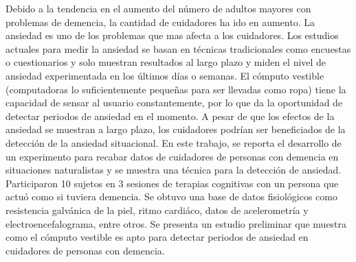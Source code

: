 Debido a la tendencia en el aumento del n\'umero de adultos mayores con problemas de demencia, la cantidad de cuidadores ha ido en aumento. La ansiedad es uno de los problemas que mas afecta a los cuidadores. Los estudios actuales para medir la ansiedad se basan en t\'ecnicas tradicionales como encuestas o cuestionarios y solo muestran resultados al largo plazo y miden el nivel de ansiedad experimentada en los \'ultimos d\'ias o semanas. El c\'omputo vestible (computadoras lo suficientemente peque\~nas para ser llevadas como ropa) tiene la capacidad de sensar al usuario constantemente, por lo que da la oportunidad de detectar periodos de ansiedad en el momento. A pesar de que los efectos de la ansiedad se muestran a largo plazo, los cuidadores podr\'ian ser beneficiados de la detecci\'on de la ansiedad situacional. En este trabajo, se reporta el desarrollo de un experimento para recabar datos de cuidadores de personas con demencia en situaciones naturalistas y se muestra una t\'ecnica para la detecci\'on de ansiedad. Participaron 10 sujetos en 3 sesiones de terapias cognitivas con un persona que actu\'o como si tuviera demencia. Se obtuvo una base de datos fisiol\'ogicos como resistencia galv\'anica de la piel, ritmo cardi\'aco, datos de acelerometr\'ia y electroencefalograma, entre otros. Se presenta un estudio preliminar que muestra como el c\'omputo vestible es apto para detectar periodos de ansiedad en cuidadores de personas con demencia.
